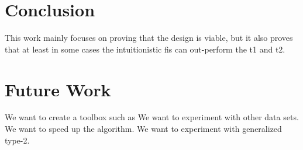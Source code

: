 \documentclass[conference]{IEEEtran}
\begin{document}
\section{Conclusion}

This work mainly focuses on proving that the design is viable, but it
also proves that at least in some cases the intuitionistic fis can
out-perform the t1 and t2.

\section{Future Work}

We want to create a toolbox such as \cite{castro2007interval}
We want to experiment with other data sets.
We want to speed up the algorithm.
We want to experiment with generalized type-2.



\end{document}
